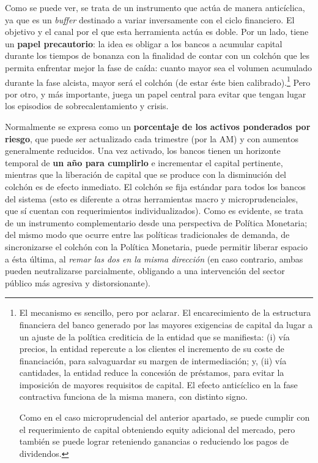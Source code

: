 \documentclass[10pt,a4paper]{article}
\begin{document}
Como se puede ver, se trata de un instrumento que actúa de manera anticíclica, ya que es un \textit{buffer} destinado a variar inversamente con el ciclo financiero. El objetivo y el canal por el que esta herramienta actúa es doble. Por un lado, tiene un \textbf{papel precautorio}: la idea es obligar a los bancos a acumular capital durante los tiempos de bonanza con la finalidad de contar con un colchón que les permita enfrentar mejor la fase de caída: cuanto mayor sea el volumen acumulado durante la fase alcista, mayor será el colchón (de estar éste bien calibrado).\footnote{
El mecanismo es sencillo, pero por aclarar. El encarecimiento de la estructura financiera del banco generado por las mayores exigencias de capital da lugar a un ajuste de la política crediticia de la entidad que se manifiesta: (i) vía precios, la entidad repercute a los clientes el incremento de su coste de financiación, para salvaguardar su margen de intermediación; y, (ii) vía cantidades, la entidad reduce la concesión de préstamos, para evitar la imposición de mayores requisitos de capital. El efecto anticíclico en la fase contractiva funciona de la misma manera, con distinto signo.

Como en el caso microprudencial del anterior apartado, se puede cumplir con el requerimiento de capital obteniendo equity adicional del mercado, pero también se puede lograr reteniendo ganancias o reduciendo los pagos de dividendos.

} Pero por otro, y más importante, juega un papel central para evitar que tengan lugar los episodios de sobrecalentamiento y crisis. 

Normalmente se expresa como un \textbf{porcentaje de los activos ponderados por riesgo}, que puede ser actualizado cada trimestre (por la AM) y con aumentos generalmente reducidos. Una vez activado, los bancos tienen un horizonte temporal de \textbf{un año para cumplirlo} e incrementar el capital pertinente, mientras que la liberación de capital que se produce con la disminución del colchón es de efecto inmediato. El colchón se fija estándar para todos los bancos del sistema (esto es diferente a otras herramientas macro y microprudenciales, que sí cuentan con requerimientos individualizados). Como es evidente, se trata de un instrumento complementario desde una perspectiva de Política Monetaria; del mismo modo que ocurre entre las políticas tradicionales de demanda, de sincronizarse el colchón con la Política Monetaria, puede permitir liberar espacio a ésta última, al \textit{remar las dos en la misma dirección} (en caso contrario, ambas pueden neutralizarse parcialmente, obligando a una intervención del sector público más agresiva y distorsionante).
\end{document}
